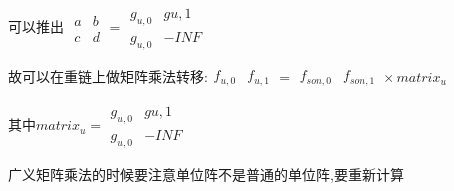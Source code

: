 \documentclass[a4paper]{ctexart}
\begin{document}
可以推出     $\begin{matrix}a&b\\c&d\end{matrix}=\begin{matrix}g_{u,0}&g{u,1}\\g_{u,0}&-INF\end{matrix}$

故可以在重链上做矩阵乘法转移:$\begin{matrix}f_{u,0}&f_{u,1}\end{matrix}=\begin{matrix}f_{son,0}&f_{son,1}\end{matrix}\times matrix_u$

其中$matrix_u=\begin{matrix}g_{u,0}&g{u,1}\\g_{u,0}&-INF\end{matrix}$

广义矩阵乘法的时候要注意单位阵不是普通的单位阵,要重新计算
\end{document}
